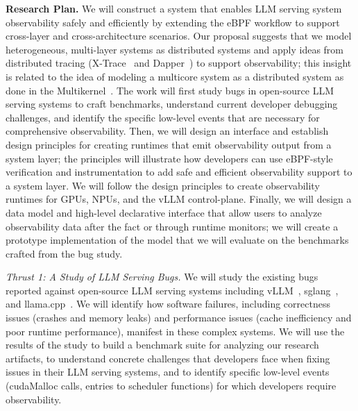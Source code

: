 \noindent \textbf{Research Plan.}  We will construct a system that enables LLM serving system observability safely and efficiently by extending the eBPF workflow to support cross-layer and cross-architecture scenarios.  Our proposal suggests that we model heterogeneous, multi-layer systems as distributed systems and apply ideas from distributed tracing (\eg X-Trace~\cite{fonseca2007xtrace} and Dapper~\cite{sigelman2010dapper}) to support observability; this insight is related to the idea of modeling a multicore system as a distributed system as done in the Multikernel~\cite{Baumann_2009_multikernel}.  The work will first study bugs in open-source LLM serving systems to craft benchmarks, understand current developer debugging challenges, and identify the specific low-level events that are necessary for comprehensive observability.  Then, we will design an interface and establish design principles for creating runtimes that emit observability  output from a system layer; the principles will illustrate how developers can use eBPF-style verification and instrumentation to add safe and efficient observability support to a system layer.  We will follow the design principles to create observability runtimes for GPUs, NPUs, and the vLLM control-plane.  Finally, we will design a data model and high-level declarative interface that allow users to analyze observability data after the fact or through runtime monitors; we will create a prototype implementation of the model that we will evaluate on the benchmarks crafted from the bug study. 

\textit{Thrust 1: A Study of LLM Serving Bugs.}  
We will study the existing bugs reported against open-source LLM serving systems including vLLM~\cite{kwon2023pagedattention}, sglang~\cite{li2023sglang}, and llama.cpp~\cite{touvron_2023_llama}.  We will identify how software failures, including correctness issues (\eg crashes and memory leaks) and performance issues (\eg cache inefficiency and poor runtime performance), manifest in these complex systems.  We will use the results of the study to build a benchmark suite for analyzing our research artifacts, to understand concrete challenges that developers face when fixing issues in their LLM serving systems, and to identify specific low-level events (\eg cudaMalloc calls, entries to scheduler functions) for which developers require observability.  


